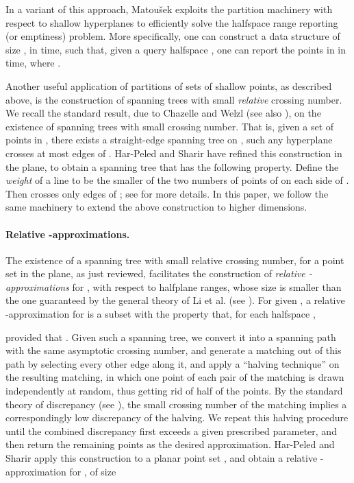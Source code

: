 \documentclass[11pt]{article}
\begin{document}
In a variant of this approach, Matou\v{s}ek \cite{mat92b} exploits the partition machinery with respect to shallow hyperplanes to efficiently solve the
halfspace range reporting (or emptiness) problem. More specifically, one can construct a data structure of size , in  time,
such that, given a query halfspace , one can report the points in  in  time,
where .

Another useful application of partitions of sets of shallow points, as described above, is the construction of spanning trees with small {\em relative}
crossing number. We recall the standard result, due to Chazelle and Welzl \cite{cw89} (see also \cite{wel92}), on the existence of spanning trees with small
crossing number. That is, given a set  of  points in , there exists a straight-edge spanning tree  on , such any hyperplane
crosses at most  edges of . Har-Peled and Sharir have refined this construction in the plane, to obtain a spanning tree  that
has the following property. Define the {\em weight}  of a line  to be the smaller of the two numbers of points of  on each side of
. Then  crosses only  edges of ; see \cite{hs11} for more details. In this paper, we follow the same machinery to
extend the above construction to higher dimensions.

\paragraph{Relative -approximations.} The existence of a spanning tree with small relative crossing number, for a point set  in the plane, as just
reviewed, facilitates the construction of {\em relative -approximations} for , with respect to halfplane ranges, whose size is smaller than the
one guaranteed by the general theory of Li et al. \cite{lls01} (see \cite{hs11}). For given , a relative -approximation for  is a
subset  with the property that, for each halfspace ,

provided that . Given such a spanning tree, we convert it into a spanning path with the same asymptotic crossing number, and
generate a matching out of this path by selecting every other edge along it, and apply a ``halving technique'' on the resulting matching, in which one point
of each pair of the matching is drawn independently at random, thus getting rid of half of the points. By the standard theory of discrepancy (see
\cite{cha01}), the small crossing number of the matching implies a correspondingly low discrepancy of the halving. We repeat this halving procedure until
the combined discrepancy first exceeds a given prescribed parameter, and then return the remaining points as the desired approximation. Har-Peled and Sharir
\cite{hs11} apply this construction to a planar point set , and obtain a relative -approximation for , of size
\end{document}
